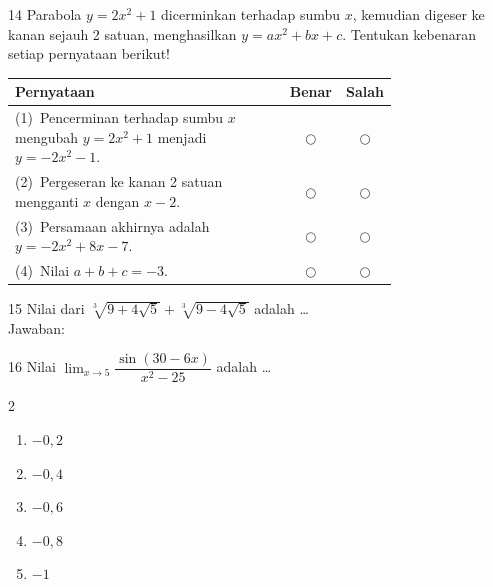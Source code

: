 \documentclass[11pt]{article}
\newenvironment{pilB}{%
  \par\smallskip\begin{multicols}{2}
  \begin{enumerate}[label=(\Alph*),leftmargin=*,itemsep=1pt,topsep=3pt]}%
  {\end{enumerate}\end{multicols}}
\begin{document}
\begin{soal}{14}
Parabola $y=2x^2+1$ dicerminkan terhadap sumbu $x$, kemudian digeser
ke kanan sejauh 2 satuan, menghasilkan $y=ax^2+bx+c$.
Tentukan kebenaran setiap pernyataan berikut!

\par\smallskip
{\renewcommand{\arraystretch}{1.4}%
\begin{tabular}{@{}p{0.76\linewidth}cc@{}}
\hline
\textbf{Pernyataan} & \textbf{Benar} & \textbf{Salah}\\
\hline
(1)~Pencerminan terhadap sumbu $x$ mengubah $y=2x^2+1$ menjadi
    $y=-2x^2-1$.
  & $\bigcirc$ & $\bigcirc$\\
(2)~Pergeseran ke kanan 2 satuan mengganti $x$ dengan $x-2$.
  & $\bigcirc$ & $\bigcirc$\\
(3)~Persamaan akhirnya adalah $y=-2x^2+8x-7$.
  & $\bigcirc$ & $\bigcirc$\\
(4)~Nilai $a+b+c = -3$.
  & $\bigcirc$ & $\bigcirc$\\
\hline
\end{tabular}}
\end{soal}

\begin{soal}{15}
Nilai dari $\sqrt[3]{9+4\sqrt{5}}+\sqrt[3]{9-4\sqrt{5}}$ adalah \ldots\\[0.4em]
Jawaban:\enspace\underline{\hspace{4cm}}
\end{soal}

\begin{soal}{16}
Nilai $\displaystyle\lim_{x\to5}\dfrac{\sin(30-6x)}{x^2-25}$ adalah \ldots
\begin{pilB}
  \item $-0{,}2$ \item $-0{,}4$ \item $-0{,}6$ \item $-0{,}8$ \item $-1$
\end{pilB}
\end{soal}
\end{document}
